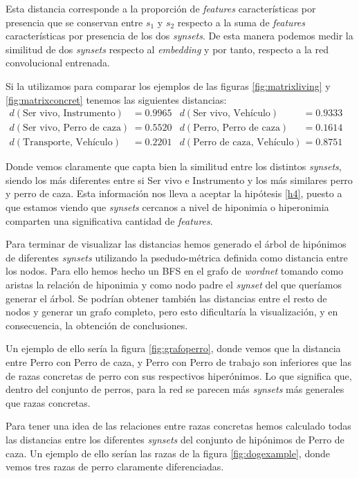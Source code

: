 \documentclass[12,twoside]{TFG-GM}
\theoremstyle{definition}
\theoremstyle{remark}
\begin{document}
Esta distancia corresponde a la proporción de \textit{features} características por presencia que se conservan entre $s_1$ y $s_2$ respecto a la suma de \textit{features} características por presencia de los dos \textit{synsets}.
De esta manera podemos medir la similitud de dos \textit{synsets} respecto al \textit{embedding} y por tanto, respecto a la red convolucional entrenada.

Si la utilizamos para comparar los ejemplos de las figuras \ref{fig:matrixliving} y \ref{fig:matrixconcret} tenemos las siguientes distancias: 
\begin{align*}
d(\text{Ser vivo, Instrumento}) &= 0.9965 & d(\text{Ser vivo, Vehículo}) &= 0.9333 \\ 
d(\text{Ser vivo, Perro de caza}) &= 0.5520 & d(\text{Perro, Perro de caza}) &= 0.1614 \\
d(\text{Transporte, Vehículo}) &= 0.2201 & d(\text{Perro de caza, Vehículo}) &=0.8751 & 
\end{align*}
	
Donde vemos claramente que capta bien la similitud entre los distintos \textit{synsets}, siendo los más diferentes entre si Ser vivo e Instrumento y los más similares perro y perro de caza. Esta información nos lleva a aceptar la hipótesis \ref{h4}, puesto a que estamos viendo que \textit{synsets} cercanos a nivel de hiponimia o hiperonimia comparten una significativa cantidad de \textit{features}.

Para terminar de visualizar las distancias hemos generado el árbol de hipónimos de diferentes \textit{synsets} utilizando la psedudo-métrica definida como distancia entre los nodos. Para ello hemos hecho un BFS en el grafo de \textit{wordnet} tomando como aristas la relación de hiponimia y como nodo padre el \textit{synset} del que queríamos generar el árbol. Se podrían obtener también las distancias entre el resto de nodos y generar un grafo completo, pero esto dificultaría la visualización, y en consecuencia, la obtención de conclusiones. 

 \newpage
Un ejemplo de ello sería la figura \ref{fig:grafoperro}, donde vemos que la distancia entre Perro con Perro de caza, y Perro con Perro de trabajo son inferiores que las de razas concretas de perro con sus respectivos hiperónimos. Lo que significa que, dentro del conjunto de perros, para la red se parecen más \textit{synsets} más generales que razas concretas.

Para tener una idea de las relaciones entre razas concretas hemos calculado todas las distancias entre los diferentes \textit{synsets} del conjunto de hipónimos de Perro de caza. Un ejemplo de ello serían las razas de la figura \ref{fig:dogexample}, donde vemos tres razas de perro claramente diferenciadas. 
\end{document}
